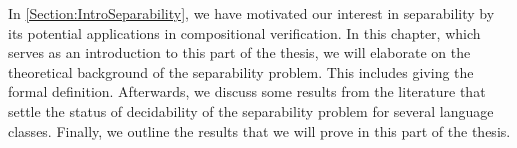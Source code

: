 \documentclass[../../diss.tex]{subfiles}
\begin{document}
In \cref{Section:IntroSeparability}, we have motivated our interest in separability by its potential applications in compositional verification.
In this chapter, which serves as an introduction to this part of the thesis, we will elaborate on the theoretical background of the separability problem.
This includes giving the formal definition.
Afterwards, we discuss some results from the literature that settle the status of decidability of the separability problem for several language classes.
Finally, we outline the results that we will prove in this part of the thesis.
\end{document}

